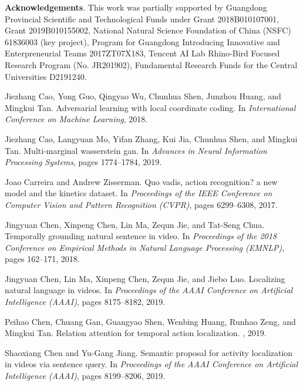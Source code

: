 \documentclass[10pt,twocolumn,letterpaper]{article}
\begin{document}
{\flushleft \bf Acknowledgements}. This work was partially supported by Guangdong Provincial Scientific and Technological Funds under Grant 2018B010107001, Grant 2019B010155002,
	National Natural Science Foundation of China (NSFC) 61836003 (key project), Program for Guangdong Introducing Innovative and Enterpreneurial Teams 2017ZT07X183,  
    Tencent AI Lab Rhino-Bird Focused Research Program (No. JR201902),
    Fundamental Research Funds for the Central Universities D2191240.

	
\small
\begin{thebibliography}{10}\itemsep=-1pt
	
	Jiezhang Cao, Yong Guo, Qingyao Wu, Chunhua Shen, Junzhou Huang, and Mingkui
	Tan.
	\newblock Adversarial learning with local coordinate coding.
	\newblock In {\em International Conference on Machine Learning}, 2018.
	
	Jiezhang Cao, Langyuan Mo, Yifan Zhang, Kui Jia, Chunhua Shen, and Mingkui Tan.
	\newblock Multi-marginal wasserstein gan.
	\newblock In {\em Advances in Neural Information Processing Systems}, pages
	1774--1784, 2019.
	
	Joao Carreira and Andrew Zisserman.
	\newblock Quo vadis, action recognition? a new model and the kinetics dataset.
	\newblock In {\em Proceedings of the IEEE Conference on Computer Vision and
		Pattern Recognition (CVPR)}, pages 6299--6308, 2017.
	
	Jingyuan Chen, Xinpeng Chen, Lin Ma, Zequn Jie, and Tat-Seng Chua.
	\newblock Temporally grounding natural sentence in video.
	\newblock In {\em Proceedings of the 2018 Conference on Empirical Methods in
		Natural Language Processing (EMNLP)}, pages 162--171, 2018.
	
	Jingyuan Chen, Lin Ma, Xinpeng Chen, Zequn Jie, and Jiebo Luo.
	\newblock Localizing natural language in videos.
	\newblock In {\em Proceedings of the AAAI Conference on Artificial Intelligence
		(AAAI)}, pages 8175--8182, 2019.
	
	Peihao Chen, Chuang Gan, Guangyao Shen, Wenbing Huang, Runhao Zeng, and Mingkui
	Tan.
	\newblock Relation attention for temporal action localization.
	, 2019.
	
	Shaoxiang Chen and Yu-Gang Jiang.
	\newblock Semantic proposal for activity localization in videos via sentence
	query.
	\newblock In {\em Proceedings of the AAAI Conference on Artificial Intelligence
		(AAAI)}, pages 8199--8206, 2019.
	

\end{thebibliography}
\end{document}
